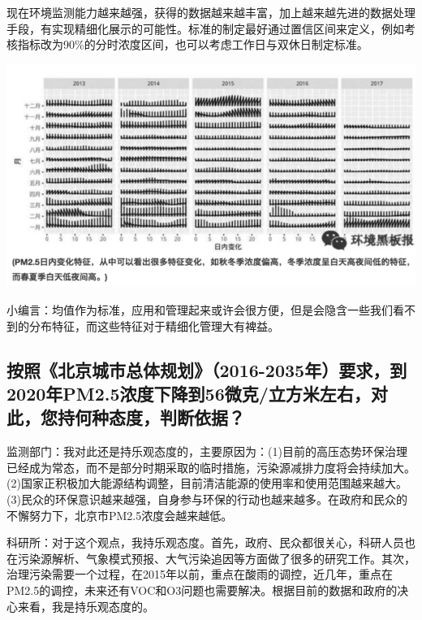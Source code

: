 \documentclass[
]{book}
\begin{document}
现在环境监测能力越来越强，获得的数据越来越丰富，加上越来越先进的数据处理手段，有实现精细化展示的可能性。标准的制定最好通过置信区间来定义，例如考核指标改为90\%的分时浓度区间，也可以考虑工作日与双休日制定标准。

\includegraphics[width=8.33in]{images/air4}

小编言：均值作为标准，应用和管理起来或许会很方便，但是会隐含一些我们看不到的分布特征，而这些特征对于精细化管理大有裨益。

\hypertarget{ux6309ux7167ux5317ux4eacux57ceux5e02ux603bux4f53ux89c4ux52122016-2035ux5e74ux8981ux6c42ux52302020ux5e74pm2.5ux6d53ux5ea6ux4e0bux964dux523056ux5faeux514bux7acbux65b9ux7c73ux5de6ux53f3ux5bf9ux6b64ux60a8ux6301ux4f55ux79cdux6001ux5ea6ux5224ux65adux4f9dux636e}{%
\subsection{按照《北京城市总体规划》（2016-2035年）要求，到2020年PM2.5浓度下降到56微克/立方米左右，对此，您持何种态度，判断依据？}\label{ux6309ux7167ux5317ux4eacux57ceux5e02ux603bux4f53ux89c4ux52122016-2035ux5e74ux8981ux6c42ux52302020ux5e74pm2.5ux6d53ux5ea6ux4e0bux964dux523056ux5faeux514bux7acbux65b9ux7c73ux5de6ux53f3ux5bf9ux6b64ux60a8ux6301ux4f55ux79cdux6001ux5ea6ux5224ux65adux4f9dux636e}}

监测部门：我对此还是持乐观态度的，主要原因为：(1)目前的高压态势环保治理已经成为常态，而不是部分时期采取的临时措施，污染源减排力度将会持续加大。(2)国家正积极加大能源结构调整，目前清洁能源的使用率和使用范围越来越大。(3)民众的环保意识越来越强，自身参与环保的行动也越来越多。在政府和民众的不懈努力下，北京市PM2.5浓度会越来越低。

科研所：对于这个观点，我持乐观态度。首先，政府、民众都很关心，科研人员也在污染源解析、气象模式预报、大气污染追因等方面做了很多的研究工作。其次，治理污染需要一个过程，在2015年以前，重点在酸雨的调控，近几年，重点在PM2.5的调控，未来还有VOC和O3问题也需要解决。根据目前的数据和政府的决心来看，我是持乐观态度的。
\end{document}
